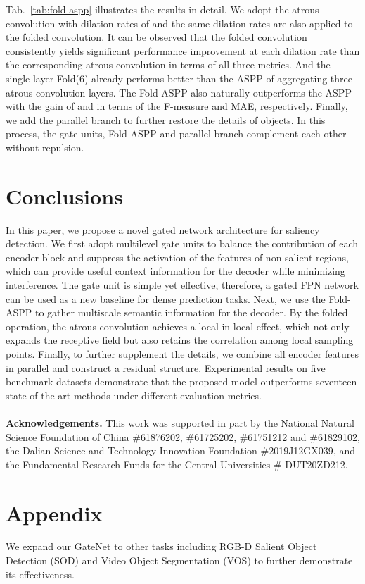 \documentclass[runningheads]{llncs}
\begin{document}
	Tab.~\ref{tab:fold-aspp} illustrates the results in detail. We adopt the atrous convolution with  dilation rates of  and the same dilation rates are also applied to the folded convolution. 
	It can be observed that the folded convolution consistently yields significant performance improvement at each dilation rate than the corresponding atrous convolution in terms of all three metrics. And the single-layer Fold(6) already performs better than the ASPP of aggregating three atrous convolution layers. 
	The Fold-ASPP also naturally outperforms the ASPP with the gain of  and  in terms of the F-measure and MAE, respectively.
	Finally, we add the parallel branch to further restore the details of objects. In this process, the gate units, Fold-ASPP and parallel branch complement each other without repulsion.
	
	
	
	
	\section{Conclusions}
	In this paper, we propose a novel 
	gated network architecture for saliency detection. 
We first adopt multilevel gate units to balance the contribution of each encoder block and suppress the activation of the features of non-salient regions, which can provide useful context information for the decoder while minimizing interference. The gate unit is simple yet effective, therefore, a gated FPN network can be used as a new baseline for dense prediction tasks. 
Next, we use the Fold-ASPP to gather multiscale semantic information for the decoder. By the folded operation, the atrous convolution achieves a local-in-local effect, which not only expands the receptive field  
	but also retains the correlation among local sampling points. 
	Finally, to further supplement the details, we combine all encoder features in parallel and construct a residual structure. 
Experimental results on five benchmark datasets demonstrate that the proposed model outperforms seventeen state-of-the-art methods under different evaluation metrics.
	\\
	\\
	\textbf{Acknowledgements.}
	This work was supported in part by the National Natural Science Foundation of China
	\#61876202, \#61725202, \#61751212 and \#61829102,
	the Dalian Science and Technology Innovation Foundation \#2019J12GX039, and the Fundamental Research Funds for the Central Universities \# DUT20ZD212.
	\appendix
	\section{Appendix}
	 We expand our GateNet to other tasks including RGB-D Salient Object Detection (SOD) and Video Object Segmentation (VOS) to further demonstrate its effectiveness.
\end{document}
